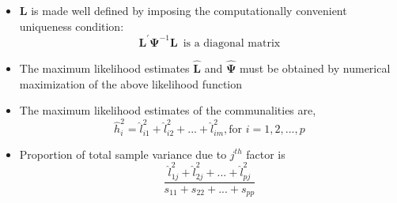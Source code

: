 \documentclass[10pt]{beamer} %
\begin{document}
\begin{frame}
   \begin{itemize}
      \item $\mathbf{L}$ is made well defined by imposing the computationally
         convenient uniqueness condition:
         \begin{equation*}
            \mathbf{L}^{'}\boldsymbol{\Psi}^{-1}\mathbf{L} \,\text{ is a diagonal
            matrix}
         \end{equation*}
      \item The maximum likelihood estimates $\mathbf{\hat{L}}$ and
         $\boldsymbol{\hat{\Psi}}$ must be obtained by numerical maximization of
         the above likelihood function
         \vspace{0.45cm}
      \item The maximum likelihood estimates of the communalities are, \begin{equation*}
            \hat{h}_i^2=\hat{l}_{i1}^2+\hat{l}_{i2}^2+...+\hat{l}_{im}^2,\text{
            for } i=1,2,...,p
         \end{equation*}
      \item Proportion of total sample variance due to $j^{th}$ factor is
         \begin{equation*}
             \frac{\hat{l}_{1j}^2+\hat{l}_{2j}^2+...+\hat{l}_{pj}^2}{s_{11}+s_{22}+...+s_{pp}}
         \end{equation*}
   \end{itemize}
\end{frame}
\end{document}
